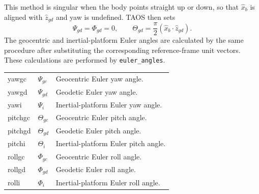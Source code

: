 This method is singular when the body points straight up or down, so that
$\hat{x}_b$ is aligned with $\hat{z}_{gd}$ and yaw is undefined. TAOS then sets
\begin{equation}
  \Psi_{gd}=\Phi_{gd}=0,
  \qquad
  \Theta_{gd}=\frac{\pi}{2}
    (\hat{x}_b\mathbin{\cdot}\hat{z}_{gd}).
  \label{eq:euler-angle-pole-convention}
\end{equation}
The geocentric and inertial-platform Euler angles are calculated by the same
procedure after substituting the corresponding reference-frame unit vectors. These
calculations are performed by \texttt{euler\_angles}.


\begin{longtable}{@{}>{\ttfamily}p{}p{}p{}@{}}
  yawgc   & $\Psi_{gc}$ & Geocentric Euler yaw angle.\\
  yawgd   & $\Psi_{gd}$ & Geodetic Euler yaw angle.\\
  yawi    & $\Psi_i$    & Inertial-platform Euler yaw angle.\\
  pitchgc & $\Theta_{gc}$ & Geocentric Euler pitch angle.\\
  pitchgd & $\Theta_{gd}$ & Geodetic Euler pitch angle.\\
  pitchi  & $\Theta_i$    & Inertial-platform Euler pitch angle.\\
  rollgc  & $\Phi_{gc}$ & Geocentric Euler roll angle.\\
  rollgd  & $\Phi_{gd}$ & Geodetic Euler roll angle.\\
  rolli   & $\Phi_i$    & Inertial-platform Euler roll angle.\\
\end{longtable}



